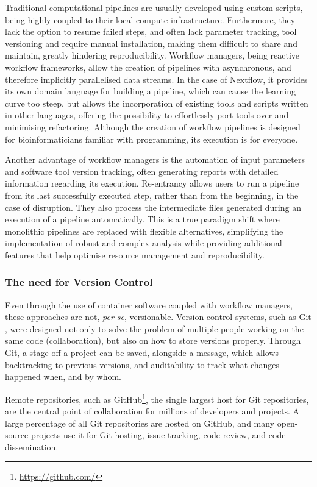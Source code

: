 Traditional computational pipelines are usually developed using custom scripts, being highly coupled to their local compute infrastructure. Furthermore, they lack the option to resume failed steps, and often lack parameter tracking, tool versioning and require manual installation, making them difficult to share and maintain, greatly hindering reproducibility. Workflow managers, being reactive workflow frameworks, allow the creation of pipelines with asynchronous, and therefore implicitly parallelised data streams. In the case of Nextflow, it provides its own domain language for building a pipeline, which can cause the learning curve too steep, but allows the incorporation of existing tools and scripts written in other languages, offering the possibility to effortlessly port tools over and minimising refactoring. Although the creation of workflow pipelines is designed for bioinformaticians familiar with programming, its execution is for everyone. 

Another advantage of workflow managers is the automation of input parameters and software tool version tracking, often generating reports with detailed information regarding its execution. Re-entrancy allows users to run a pipeline from its last successfully executed step, rather than from the beginning, in the case of disruption. They also process the intermediate files generated during an execution of a pipeline automatically. This is a true paradigm shift where monolithic pipelines are replaced with flexible alternatives, simplifying the implementation of robust and complex analysis while providing additional features that help optimise resource management and reproducibility.  

\subsubsection{The need for Version Control}

Even through the use of container software coupled with workflow managers, these approaches are not, \textit{per se}, versionable. Version control systems, such as Git \citep{chacon2014pro}, were designed not only to solve the problem of multiple people working on the same code (collaboration), but also on how to store versions properly. Through Git, a stage off a project can be saved, alongside a message, which allows backtracking to previous versions, and auditability to track what changes happened when, and by whom. 

Remote repositories, such as GitHub\footnote{\url{https://github.com/}}, the single largest host for Git repositories, are the central point of collaboration for millions of developers and projects. A large percentage of all Git repositories are hosted on GitHub, and many open-source projects use it for Git hosting, issue tracking, code review, and code dissemination. 

